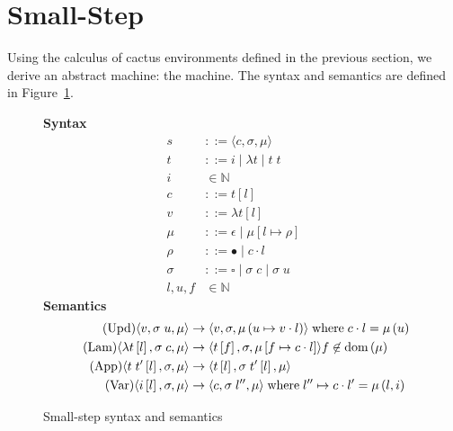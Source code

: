 \section{Small-Step \ce} \label{sec:mach}

Using the calculus of cactus environments defined in the previous section, we
derive an abstract machine: the \ce machine. The syntax and semantics are
defined in Figure~\ref{fig:cesm}. 

\begin{figure}
\textbf{Syntax}
\begin{align*}
\tag{State} s &::= \langle c, \sigma, \mu \rangle \\
\tag{Term} t &::= i \; | \; \lambda t \; | \; t \; t  \\
\tag{Variable} i &\in \mathbb{N}  \\
\tag{Closure} c &::= t \left[l\right] \\
\tag{Value} v &::= \lambda t\left[l\right] \\
\tag{Heap} \mu &::= \epsilon \; | \; \mu \left[ l \mapsto \rho \right] \\
\tag{Environment} \rho &::= \bullet \; | \; c \cdot l \\
\tag{Stack} \sigma &::= \square \; | \; \sigma \; c \;  | \; \sigma \; u \\
\tag{Location} l,u,f &\in \mathbb{N}
\end{align*}
\textbf{Semantics}
\begin{align*}
\tag{Upd}
\langle v,  \sigma \; u , \mu \rangle 
  &\rightarrow
\langle v, \sigma, \mu\left(u \mapsto v \cdot l\right) \rangle  
\; \textnormal{where} \; c \cdot l = \mu\left(u\right) \\
\tag{Lam}
\langle \lambda t\left[l\right], \sigma \; c, \mu \rangle 
  &\rightarrow
\langle t\left[f\right], \sigma, \mu\left[f \mapsto c \cdot l\right]\rangle f
\not \in \textnormal{dom}\left(\mu\right)  \\
\tag{App}
\langle t \; t'\left[l\right], \sigma, \mu \rangle
  &\rightarrow
\langle t\left[l\right], \sigma \; t'\left[l\right], \mu \rangle \\
\tag{Var}
\langle i\left[l\right], \sigma, \mu \rangle
  &\rightarrow
\langle c, \sigma \; l'', \mu \rangle
\; \textnormal{where} \; l'' \mapsto c \cdot l' = \mu\left(l, i\right)
\end{align*}
\caption{Small-step \ce syntax and semantics}
\label{fig:cesm}
\end{figure}

